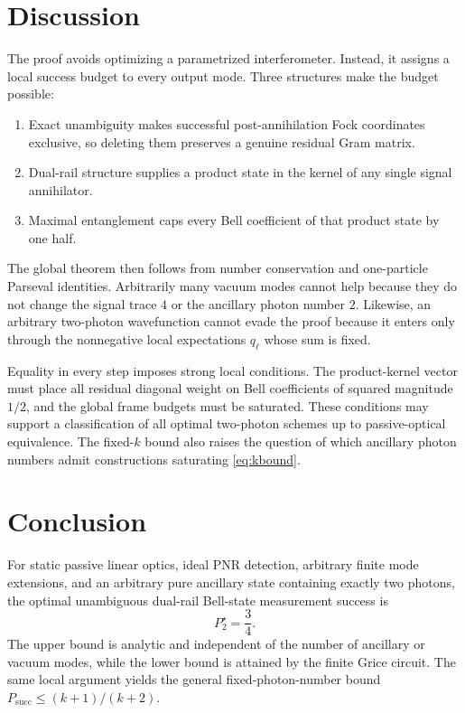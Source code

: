 \documentclass[11pt]{article}
\theoremstyle{remark}
\newcommand{\Pstar}{P_2^\star}
\begin{document}
\section{Discussion}

The proof avoids optimizing a parametrized interferometer. Instead, it assigns
a local success budget to every output mode. Three structures make the budget
possible:

\begin{enumerate}[leftmargin=2em]
\item Exact unambiguity makes successful post-annihilation Fock coordinates
exclusive, so deleting them preserves a genuine residual Gram matrix.
\item Dual-rail structure supplies a product state in the kernel of any single
signal annihilator.
\item Maximal entanglement caps every Bell coefficient of that product state by
one half.
\end{enumerate}

The global theorem then follows from number conservation and one-particle
Parseval identities. Arbitrarily many vacuum modes cannot help because they do
not change the signal trace \(4\) or the ancillary photon number \(2\).
Likewise, an arbitrary two-photon wavefunction cannot evade the proof because it
enters only through the nonnegative local expectations \(q_\ell\) whose sum is
fixed.

Equality in every step imposes strong local conditions. The product-kernel
vector must place all residual diagonal weight on Bell coefficients of squared
magnitude \(1/2\), and the global frame budgets must be saturated. These
conditions may support a classification of all optimal two-photon schemes up
to passive-optical equivalence. The fixed-\(k\) bound also raises the question
of which ancillary photon numbers admit constructions saturating
\cref{eq:kbound}.

\section{Conclusion}

For static passive linear optics, ideal PNR detection, arbitrary finite mode
extensions, and an arbitrary pure ancillary state containing exactly two
photons, the optimal unambiguous dual-rail Bell-state measurement success is
\begin{equation*}
  \boxed{\Pstar=\frac34.}
\end{equation*}
The upper bound is analytic and independent of the number of ancillary or
vacuum modes, while the lower bound is attained by the finite Grice circuit.
The same local argument yields the general fixed-photon-number bound
\(P_{\mathrm{succ}}\le(k+1)/(k+2)\).
\end{document}
